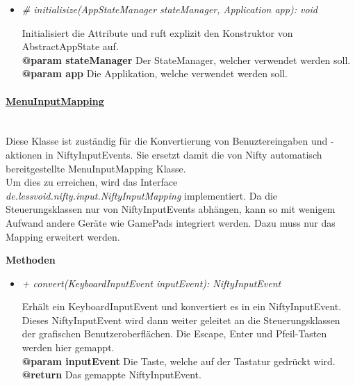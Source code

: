             \begin{itemize}
                \item  \textit{\# initialisize(AppStateManager stateManager, Application app): void} 
                    \begin{leftbar}[0.9\linewidth]
                        Initialisiert die Attribute und ruft explizit den Konstruktor
                        von AbstractAppState auf. \\
                        \textbf{@param stateManager} Der StateManager, welcher verwendet werden
                        soll.\\
                        \textbf{@param app} Die Applikation, welche verwendet werden
                        soll.\\
                    \end{leftbar}
            \end{itemize}

        \pagebreak
        \paragraph{\underline{MenuInputMapping}}\label{mim} \mbox{}\\
            Diese Klasse ist zuständig für die Konvertierung von Benuztereingaben
            und -aktionen in NiftyInputEvents. Sie ersetzt damit die von Nifty automatisch
            bereitgestellte MenuInputMapping Klasse.\\
            Um dies zu erreichen, wird das Interface 
            \textit{de.lessvoid.nifty.input.NiftyInputMapping} implementiert.
            Da die Steuerungsklassen nur von NiftyInputEvents abhängen, kann so mit wenigem
            Aufwand andere Geräte wie GamePads integriert werden. Dazu muss nur das Mapping
            erweitert werden.
            \par
                    
            \textbf{Methoden}					
            \begin{itemize}
                \item  \textit{+ convert(KeyboardInputEvent inputEvent): NiftyInputEvent} 
                    \begin{leftbar}[0.9\linewidth]
                        Erhält ein KeyboardInputEvent und konvertiert es in ein
                        NiftyInputEvent. Dieses NiftyInputEvent wird dann weiter 
                        geleitet an die Steuerungsklassen der grafischen 
                        Benutzeroberflächen. Die Escape, Enter und Pfeil-Tasten 
                        werden hier gemappt.\\
                        \textbf{@param inputEvent} Die Taste, welche auf der Tastatur
                        gedrückt wird.\\
                        \textbf{@return} Das gemappte NiftyInputEvent.
                    \end{leftbar}
            \end{itemize}
        
